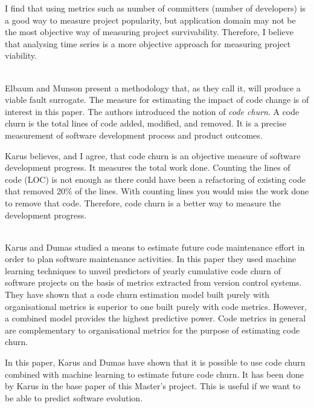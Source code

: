 \begin{description}
		I find that using metrics such as number of committers (number of developers)
		is a good way to measure project popularity, but application domain may not be
		the most objective way of measuring project survivability. Therefore, I
		believe that analysing time series is a more objective approach for measuring
		project viability.
	
	\item[\cite{elbaum}] \hfill \\
		Elbaum and Munson present a methodology that, as they call it, will produce a
		viable fault surrogate. The measure for estimating the impact of code change
		is of interest in this paper. The authors introduced the notion of \emph{code
		churn}. A code churn is the total lines of code added, modified, and removed.
		It is a precise measurement of software development process and product
		outcomes.
		
		Karus believes, and I agree, that code churn is an objective measure of
		software development progress. It measures the total work done. Counting the
		lines of code (LOC) is not enough as there could have been a refactoring of
		existing code that removed 20\% of the lines. With counting lines you would
		miss the work done to remove that code. Therefore, code churn is a better
		way to measure the development progress.
	
	\item[\cite{dumas}] \hfill \\
		Karus and Dumas studied a means to estimate future code maintenance effort in
		order to plan software maintenance activities. In this paper they used machine
		learning techniques to unveil predictors of yearly cumulative code churn of
		software projects on the basis of metrics extracted from version control
		systems. They have shown that a code churn estimation model built purely with
		organisational metrics is superior to one built purely with code metrics.
		However, a combined model provides the highest predictive power. Code metrics
		in general are complementary to organisational metrics for the purpose of
		estimating code churn.
		
		In this paper, Karus and Dumas have shown that it is possible to use code
		churn combined with machine learning to estimate future code churn. It has
		been done by Karus in the base paper of this Master's project. This is useful
		if we want to be able to predict software evolution.
\end{description}


